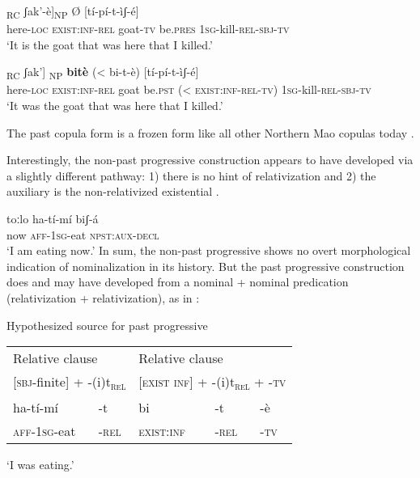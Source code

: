 \documentclass[output=paper]{langsci/langscibook}
\begin{document}
\ea\label{ex:mahland:69}
\gll [[nà-àt       \textbf{bi-t}]\textsubscript{RC}               ʃak'-è]\textsubscript{NP} Ø    [tí-pí-t-ìʃ-é]
\\
{\db}{\db}here-\textsc{loc}    \textsc{exist}:\textsc{inf-rel}    goat-\textsc{tv}    be.\textsc{pres}  {\db}\textsc{1sg}{}-kill-\textsc{rel-sbj-tv}\\
\glt `It is the goat that was here that I killed.'
\z

\ea\label{ex:mahland:70}
\gll [[nà-àt    \textbf{bi-t}]\textsubscript{RC}             ʃak']\textsubscript{ NP}    \textbf{bitè}    ({\textless} bi-t-è)      [tí-pí-t-ìʃ-é]\\
{\db}{\db}here\textsc{{}-loc}   \textsc{exist:inf-rel}   goat    be.\textsc{pst}  ({\textless} \textsc{exist:inf-rel-tv})  {\db}\textsc{1sg}{}-kill-\textsc{rel-sbj-tv}\\
\glt `It was the goat that was here that I killed.'
\z

The past copula form is a frozen form like all other Northern Mao copulas today \citep[465]{AhlandM2012}.

Interestingly, the non-past progressive construction appears to have developed via a slightly different pathway: 1) there is no hint of relativization and 2) the auxiliary is the non-relativized existential . 

\ea\label{ex:mahland:71}
\gll toːlo   ha-tí-mí         biʃ-á   \\
now   \textsc{aff-1sg}{}-eat    \textsc{npst:aux-decl} \\
\glt `I am eating now.'
\z
In sum, the non-past progressive shows no overt morphological indication of nominalization in its history. But the past progressive construction does and may have developed from a nominal + nominal predication (relativization + relativization), as in : 

\ea\label{ex:mahland:72}{Hypothesized source for past progressive}\\
\begin{tabular}{lllll}
\multicolumn{2}{l}{Relative clause} & \multicolumn{3}{l}{Relative clause} \\
\multicolumn{2}{l}{[\textsc{sbj-}finite] + -(i)t\textsubscript{\textsc{rel}}} & \multicolumn{3}{l}{[\textsc{exist inf}] + -(i)t\textsubscript{\textsc{rel}} + -\textsc{tv}} \\
ha-tí-mí &  {}-t    &                bi & -t & -è\\
\textsc{aff}-\textsc{1sg}-eat  &  {}-\textsc{rel}  &   \textsc{exist:inf} & \textsc{-rel} & \textsc{-tv} \\
\end{tabular}
\glt `I was eating.'
\z
\end{document}
